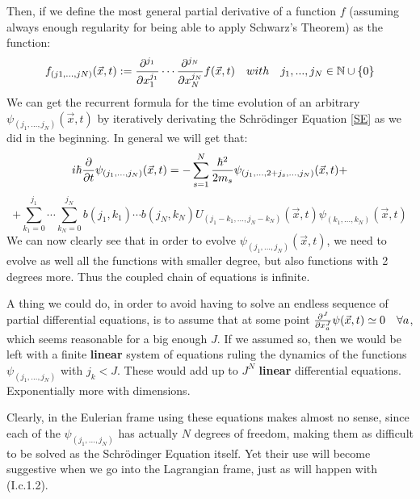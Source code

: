 \documentclass[11pt, a4paper]{article} %
\newcommand{\N}{\mathbb{N}}
\begin{document}
Then, if we define the most general partial derivative of a function $f$ (assuming always enough regularity for being able to apply Schwarz's Theorem) as the function:\vspace{-0.1cm}
\begin{equation}\label{defPdv}
f_{(j1,...,jN)}(\vec{x},t):=\pdv[j_1]{}{x_1}\cdots\pdv[j_N]{}{x_N} f(\vec{x},t) \quad with\quad j_1,...,j_N\in \N\cup \{0\}\vspace{-0.1cm}
\end{equation}
We can get the recurrent formula for the time evolution of an arbitrary $\psi_{(j_1,...,j_N)}(\vec{x},t)$ by iteratively derivating the Schrödinger Equation \eqref{SE} as we did in the beginning. In general we will get that:\vspace{-0.1cm}
\begin{equation}\label{infchain.SE}
i\hbar \pdv{}{t}\psi_{(j_1,...,j_N)}(\vec{x},t)=-\sum_{s=1}^N\frac{\hbar^2}{2m_s}\psi_{(j_1,...,2+j_s,...,j_N)}(\vec{x},t)+\vspace{-0.1cm}
\end{equation}
$$
+\sum_{k_1=0}^{j_1}\cdots\sum_{k_N=0}^{j_N} b(j_1,k_1)\cdots b(j_N,k_N)U_{(j_1-k_1,...,j_N-k_N)}(\vec{x},t)\psi_{(k_1,...,k_N)}(\vec{x},t)
$$
We can now clearly see that in order to evolve $\psi_{(j_1,...,j_N)}(\vec{x},t)$, we need to evolve as well all the functions with smaller degree, but also functions with 2 degrees more. Thus the coupled chain of equations is infinite.

A thing we could do, in order to avoid having to solve an endless sequence of partial differential equations, is to assume that at some point $\pdv[J]{}{x_a}\psi(\vec{x},t)\simeq 0\quad \forall a$, which seems reasonable for a big enough $J$. If we assumed so, then we would be left with a finite {\bf linear} system of equations ruling the dynamics of the functions $\psi_{(j_1,...,j_N)}$ with $j_k<J$. These would add up to $J^N$ {\bf linear} differential equations. Exponentially more with dimensions.

Clearly, in the Eulerian frame using these equations makes almost no sense, since each of the $\psi_{(j_1,...,j_N)}$ has actually $N$ degrees of freedom, making them as difficult to be solved as the Schrödinger Equation itself. Yet their use will become suggestive when we go into the Lagrangian frame, just as will happen with (I.c.1.2).\vspace{-0.3cm}
\end{document}
